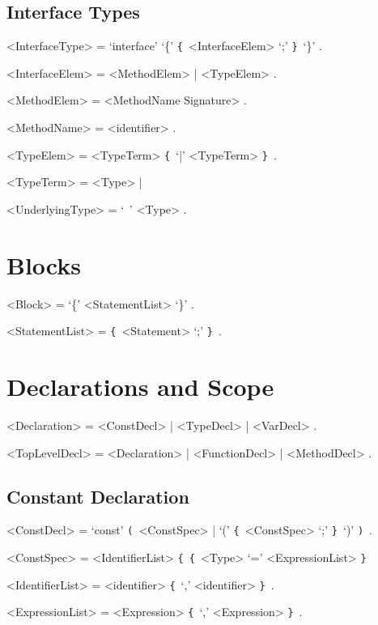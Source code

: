 \documentclass{article}
\def\lrep{\synshortsoff\texttt{\{}\synshorts~}
\def\rrep{\synshortsoff\texttt{\}}\synshorts~}
\def\lgrp{\synshortsoff\texttt{(}\synshorts~}
\def\rgrp{\synshortsoff\texttt{)}\synshorts~}
\begin{document}
\subsection*{Interface Types} 
\begin{grammar}
	<InterfaceType>  = `interface' `\{' \lrep <InterfaceElem> `;' \rrep `\}' .

	<InterfaceElem> = <MethodElem> | <TypeElem> .

	<MethodElem> = <MethodName Signature> .

	<MethodName> = <identifier> .

	<TypeElem> = <TypeTerm> \lrep `|' <TypeTerm> \rrep .

	<TypeTerm> = <Type> | %

	<UnderlyingType>  = `~' <Type> .
\end{grammar} 




\section*{Blocks} 
\begin{grammar} 
	<Block> = `\{' <StatementList> `\}' . 

	<StatementList> = \lrep <Statement> `;' \rrep .

\end{grammar}

\section*{Declarations and Scope} 
\begin{grammar} 
	<Declaration> = <ConstDecl> | <TypeDecl> | <VarDecl> .

	<TopLevelDecl> = <Declaration> | <FunctionDecl> | <MethodDecl> . 
\end{grammar} 

\subsection*{Constant Declaration}
\begin{grammar}
	<ConstDecl> = `const' \lgrp <ConstSpec> | `(' \lrep <ConstSpec> `;' \rrep `)' \rgrp .

	<ConstSpec> = <IdentifierList> \lrep \lrep <Type> `=' <ExpressionList> \rrep

	<IdentifierList> = <identifier> \lrep `,' <identifier> \rrep . 

	<ExpressionList> = <Expression> \lrep `,' <Expression> \rrep . 
\end{grammar} 
\end{document}

